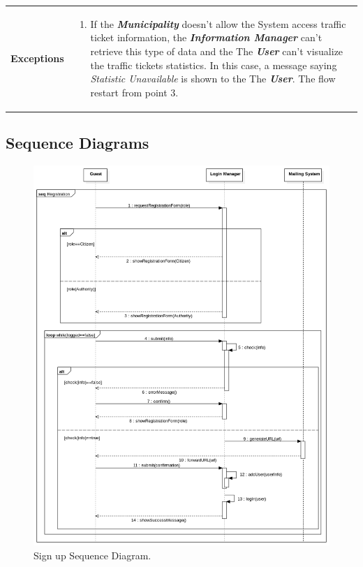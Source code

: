 \documentclass{report}
\begin{document}
\begin{tabularx}{\linewidth}{| l | X |}
	\hline
	\textbf{Exceptions} & \parbox{0.7\textwidth}{ \begin{enumerate}
			\item If the \textbf{\textit{Municipality}} doesn't allow the System access traffic ticket information, the \textbf{\textit{Information Manager}} can't retrieve this type of data and the The \textbf{\textit{User}} can't visualize the traffic tickets statistics. In this case, a message saying \textit{Statistic Unavailable} is shown to the The \textbf{\textit{User}}. The flow restart from point 3.  
		\end{enumerate}}\\
	
	\hline
	
\end{tabularx}
\newpage
\subsection{Sequence Diagrams}
\begin{figure}[ht!]
	\begin{center}
	\includegraphics[width=\textwidth]{./img/RegistrationSD.png}
	\end{center}
	\caption{Sign up Sequence Diagram.}
	\label{fig:SequenceDiagram1}
	\end{figure}
\end{document}
